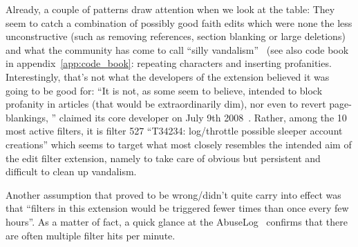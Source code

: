 Already, a couple of patterns draw attention when we look at the table:
They seem to catch a combination of possibly good faith edits which were none the less unconstructive (such as removing references, section blanking or large deletions)
and what the community has come to call ``silly vandalism''~\cite{Wikipedia:VandalismTypes} (see also code book in appendix~\ref{app:code_book}: repeating characters and inserting profanities.
Interestingly, that's not what the developers of the extension believed it was going to be good for:
``It is not, as some seem to believe, intended to block profanity in articles (that would be extraordinarily dim), nor even to revert page-blankings, '' claimed its core developer on July 9th 2008~\cite{Wikipedia:EditFilterTalkArchive1Clarification}.
Rather, among the 10 most active filters, it is filter 527 ``T34234: log/throttle possible sleeper account creations'' which seems to target what most closely resembles the intended aim of the edit filter extension, namely to take care of obvious but persistent and difficult to clean up vandalism.

Another assumption that proved to be wrong/didn't quite carry into effect was that ``filters in this extension would be triggered fewer times than once every few hours''.
As a matter of fact, a quick glance at the AbuseLog~\cite{Wikipedia:AbuseLog} confirms that there are often multiple filter hits per minute.

